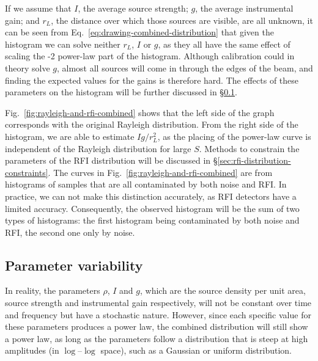 \documentclass[useAMS,usenatbib]{mn2e}
\begin{document}
If we assume that $I$, the average source strength; $g$, the average instrumental gain; and $r_L$, the distance over which those sources are visible, are all unknown, it can be seen from Eq.~\eqref{eq:drawing-combined-distribution} that given the histogram we can solve neither $r_L$, $I$ or $g$, as they all have the same effect of scaling the -2 power-law part of the histogram. Although calibration could in theory solve $g$, almost all sources will come in through the edges of the beam, and finding the expected values for the gains is therefore hard. The effects of these parameters on the histogram will be further discussed in \S\ref{sec:parameter-variability}.

Fig.~\ref{fig:rayleigh-and-rfi-combined} shows that the left side of the graph corresponds with the original Rayleigh distribution. From the right side of the histogram, we are able to estimate $Ig/r_L^2$, as the placing of the power-law curve is independent of the Rayleigh distribution for large $S$. Methods to constrain the parameters of the RFI distribution will be discussed in \S\ref{sec:rfi-distribution-constraints}. The curves in Fig.~\ref{fig:rayleigh-and-rfi-combined} are from histograms of samples that are all contaminated by both noise and RFI. In practice, we can not make this distinction accurately, as RFI detectors have a limited accuracy. Consequently, the observed histogram will be the sum of two types of histograms: the first histogram being contaminated by both noise and RFI, the second one only by noise.

%
%
%

\subsection{Parameter variability} \label{sec:parameter-variability}
In reality, the parameters $\rho$, $I$ and $g$, which are the source density per unit area, source strength and instrumental gain respectively, will not be constant over time and frequency but have a stochastic nature. However, since each specific value for these parameters produces a power law, the combined distribution will still show a power law, as long as the parameters follow a distribution that is steep at high amplitudes (in $\log$--$\log$ space), such as a Gaussian or uniform distribution.
\end{document}
